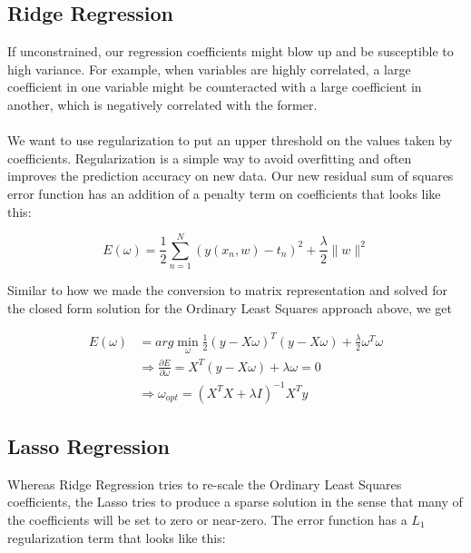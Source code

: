 \documentclass[letterpaper]{article}
\begin{document}
\subsection{Ridge Regression}
If unconstrained, our regression coefficients might blow up and be susceptible to high variance. For example, when variables are highly correlated, a large coefficient in one variable might be counteracted with a large coefficient in another, which is negatively correlated with the former.\\ 
\\
\noindent We want to use regularization to put an upper threshold on the values taken by coefficients. Regularization is a simple way to avoid overfitting and often improves the prediction accuracy on new data. Our new residual sum of squares error function has an addition of a penalty term on coefficients that looks like this:

$$E(\omega) = \frac{1}{2} \sum_{n=1}^N (y(x_n,w) - t_n)^2 + \frac{\lambda}{2} \lVert w \rVert ^2$$

Similar to how we made the conversion to matrix representation and solved for the closed form solution for the Ordinary Least Squares approach above, we get

\begin{equation}
\begin{split}
E(\omega) &= arg \min_{\omega} \frac{1}{2} (y - X\omega)^{T} (y - X\omega) + \frac{\lambda}{2} \omega^{T} \omega \\
& \Rightarrow \frac{\partial E}{\partial \omega} = X^{T}(y-X\omega) + \lambda \omega = 0 \\
&\Rightarrow \omega_{opt} = (X^{T}X + \lambda I)^{-1} X^{T}y
\end{split}
\end{equation}

\subsection{Lasso Regression}
Whereas Ridge Regression tries to re-scale the Ordinary Least Squares coefficients, the Lasso tries to produce a sparse solution in the sense that many of the coefficients will be set to zero or near-zero. The error function has a $L_1$ regularization term that looks like this:
\end{document}
